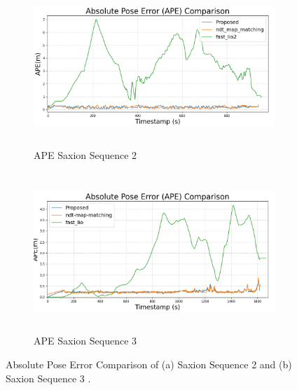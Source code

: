 \begin{figure}[H]
	
\begin{subfigure}[t]{\textwidth}
	\includegraphics[width=\linewidth , height=6cm]{images/ape_comparison_aligned_seq2.png}
	\caption{ APE Saxion Sequence 2 }
	\label{fig:Saxion-seq-2-ape}
\end{subfigure}
\hfill
\begin{subfigure}[t]{\textwidth}
	\includegraphics[width=\linewidth,height=6cm]{images/ape_comparison_seq3.png}
	\caption{ APE Saxion Sequence 3  }
	\label{fig:Saxion-seq-3-ape}
\end{subfigure}

\caption{Absolute Pose Error Comparison of   (a) Saxion Sequence 2  and (b) Saxion Sequence 3 .}
\label{fig:Saxion-seq-2-3-ape-Comparison}

\end{figure}

